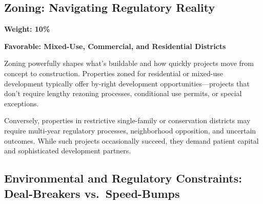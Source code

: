 \documentclass[
  letterpaper,
  DIV=11,
  numbers=noendperiod,
  oneside]{scrreprt}
\begin{document}
\subsection{Zoning: Navigating Regulatory
Reality}\label{zoning-navigating-regulatory-reality}

\textbf{Weight: 10\%}

\begin{table}

\caption{\label{tbl-zoning-scoring}Zoning Category Scoring}


\end{table}%

\textbf{Favorable: Mixed-Use, Commercial, and Residential Districts}

Zoning powerfully shapes what's buildable and how quickly projects move
from concept to construction. Properties zoned for residential or
mixed-use development typically offer by-right development
opportunities---projects that don't require lengthy rezoning processes,
conditional use permits, or special exceptions.

Conversely, properties in restrictive single-family or conservation
districts may require multi-year regulatory processes, neighborhood
opposition, and uncertain outcomes. While such projects occasionally
succeed, they demand patient capital and sophisticated development
partners.

\subsection{Environmental and Regulatory Constraints: Deal-Breakers
vs.~Speed-Bumps}\label{environmental-and-regulatory-constraints-deal-breakers-vs.-speed-bumps}
\end{document}
